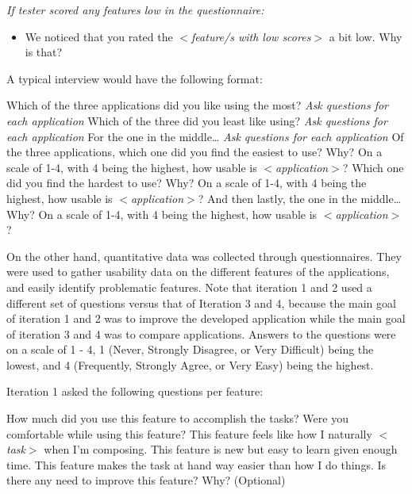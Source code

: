 		\textit{If tester scored any features low in the questionnaire:}
		\begin{itemize}
			\item We noticed that you rated the \textit{$<$feature/s with low scores$>$} a bit low. Why is that?
		\end{itemize} 
		
		A typical interview would have the following format:
		\begin{outline}
			\1 Which of the three applications did you like using the most?
				\2 \textit{Ask questions for each application}
			\1 Which of the three did you least like using?
				\2 \textit{Ask questions for each application}
			\1 For the one in the middle…
				\2 \textit{Ask questions for each application}
		\1 Of the three applications, which one did you find the easiest to use?
			\2 Why?
			\2 On a scale of 1-4, with 4 being the highest, how usable is \textit{$<$application$>$}?
		\1 Which one did you find the hardest to use?
			\2 Why?
			\2 On a scale of 1-4, with 4 being the highest, how usable is \textit{$<$application$>$}?
		\1 And then lastly, the one in the middle…
			\2 Why?
			\2 On a scale of 1-4, with 4 being the highest, how usable is \textit{$<$application$>$}?
		\end{outline}
		
		On the other hand, quantitative data was collected through questionnaires. They were used to gather usability data on the different features of the applications, and easily identify problematic features. Note that iteration 1 and 2 used a different set of questions versus that of Iteration 3 and 4, because the main goal of iteration 1 and 2 was to improve the developed application while the main goal of iteration 3 and 4 was to compare applications. Answers to the questions were on a scale of 1 - 4, 1 (Never, Strongly Disagree, or Very Difficult) being the lowest, and 4 (Frequently, Strongly Agree, or Very Easy) being the highest. 

		Iteration 1 asked the following questions per feature: 
		\begin{outline}
			\1 How much did you use this feature to accomplish the tasks?
			\1 Were you comfortable while using this feature?
			\1 This feature feels like how I naturally \textit{$<$task$>$} when I’m composing.
			\1 This feature is new but easy to learn given enough time.
			\1 This feature makes the task at hand way easier than how I do things.
			\1 Is there any need to improve this feature? Why? (Optional)
		\end{outline}

